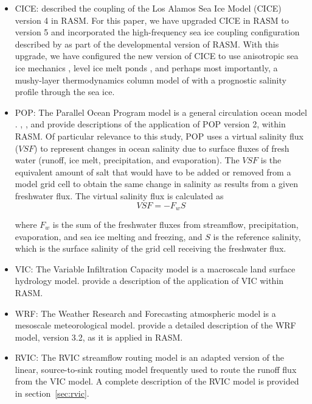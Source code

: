 \documentclass[jgrga, draft]{agutex}
\begin{document}
\begin{article}
\begin{itemize}[leftmargin=+.5in]
\item CICE: \citet{Roberts_2015a} described the coupling of the Los Alamos Sea Ice Model (CICE) version 4 in RASM.
For this paper, we have upgraded CICE in RASM to version 5 \citep{Hunke2015} and incorporated the high-frequency sea ice coupling configuration described by \citet{Roberts_2015a} as part of the developmental version of RASM.
With this upgrade, we have configured the new version of CICE to use anisotropic sea ice mechanics \citep{Tsamados2013}, level ice melt ponds \citep{Hunke2013}, and perhaps most importantly, a mushy-layer thermodynamics column model of \citet{Turner2015} with a prognostic salinity profile through the sea ice.
\item POP: The Parallel Ocean Program model is a general circulation ocean model \citep{Smith_2010}.
\citet{Maslowski_2012}, \citet{Roberts_2015a}, and \citet{Osinski_2016} provide descriptions of the application of POP version 2, within RASM.
Of particular relevance to this study, POP uses a virtual salinity flux ($VSF$) to represent changes in ocean salinity due to surface fluxes of fresh water (runoff, ice melt, precipitation, and evaporation).
The $VSF$ is the equivalent amount of salt that would have to be added or removed from a model grid cell to obtain the same change in salinity as results from a given freshwater flux.
The virtual salinity flux is calculated as
\begin{equation}
  \label{eq:SaltFlux}
  VSF=-F_w S
\end{equation}

where $F_w$ is the sum of the freshwater fluxes from streamflow, precipitation, evaporation, and sea ice melting and freezing, and $S$ is the reference salinity, which is the surface salinity of the grid cell receiving the freshwater flux.

\item VIC: The Variable Infiltration Capacity model \citep{Liang_1994} is a macroscale land surface hydrology model.
\citet{Hamman_2016} provide a description of the application of VIC within RASM.
\item WRF: The Weather Research and Forecasting atmospheric model \citep{Skamarock_2007} is a mesoscale meteorological model.
\citet{Cassano_2016} provide a detailed description of the WRF model, version 3.2, as it is applied in RASM.
\item RVIC: The RVIC streamflow routing model is an adapted version of the \citet{Lohmann_1996} linear, source-to-sink routing model frequently used to route the runoff flux from the VIC model.
A complete description of the RVIC model is provided in section~\ref{sec:rvic}.
\end{itemize}


\end{article}
\end{document}

